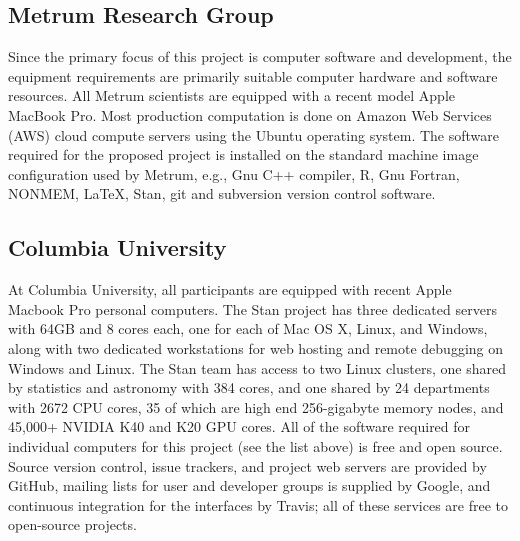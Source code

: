 \documentclass[11pt]{nih2016}
\begin{document}


\subsection{Metrum Research Group}

Since the primary focus of this project is computer software and
development, the equipment requirements are primarily suitable
computer hardware and software resources. All Metrum scientists are
equipped with a recent model Apple MacBook Pro. Most production
computation is done on Amazon Web Services (AWS) cloud compute servers
using the Ubuntu operating system. The software required for the
proposed project is installed on the standard machine image
configuration used by Metrum, e.g., Gnu C++ compiler, R, Gnu Fortran,
NONMEM, LaTeX, Stan, git and subversion version control software.

\subsection{Columbia University}

At Columbia University, all participants are equipped with recent
Apple Macbook Pro personal computers.  The Stan project has three
dedicated servers with 64GB and 8 cores each, one for each of Mac OS
X, Linux, and Windows, along with two dedicated workstations for web
hosting and remote debugging on Windows and Linux.  The Stan team has
access to two Linux clusters, one shared by statistics and astronomy
with 384 cores, and one shared by 24 departments with 2672 CPU cores,
35 of which are high end 256-gigabyte memory nodes, and 45,000+ NVIDIA
K40 and K20 GPU cores.  All of the software required for individual
computers for this project (see the list above) is free and open
source.  Source version control, issue trackers, and project web
servers are provided by GitHub, mailing lists for user and developer
groups is supplied by Google, and continuous integration for the
interfaces by Travis;  all of these services are free to open-source
projects.
\end{document}
